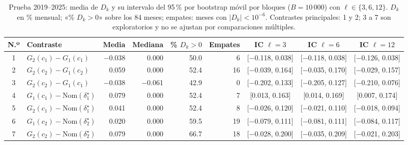 \begin{table}[h]
\centering
\footnotesize
\setlength{\tabcolsep}{4pt}
\caption{Prueba 2019--2025: media de $D_k$ y su intervalo del 95\,\% por bootstrap móvil por bloques ($B=10\,000$) con $\ell\in\{3,6,12\}$. $D_k$ en \% mensual; «\% $D_k>0$» sobre los 84 meses; empates: meses con $|D_k|<10^{-6}$. Contrastes principales: 1 y 2; 3 a 7 son exploratorios y no se ajustan por comparaciones múltiples.}\label{tab:r4_bootstrap}
\begin{tabular}{|c|l|r|r|r|r|c|c|c|}
\hline
\textbf{N.º} & \textbf{Contraste} & \textbf{Media} & \textbf{Mediana} & \textbf{\% $D_k>0$} & \textbf{Empates} & \textbf{IC $\ell=3$} & \textbf{IC $\ell=6$} & \textbf{IC $\ell=12$} \\ \hline
1 & $G_2(c_1)-G_1(c_1)$ & $-$0.038 & 0.000 & 50.0 & 6 & [$-$0.118, 0.038] & [$-$0.118, 0.038] & [$-$0.126, 0.038] \\ \hline
2 & $G_2(c_2)-G_1(c_2)$ & 0.059 & 0.000 & 52.4 & 16 & [$-$0.039, 0.164] & [$-$0.035, 0.170] & [$-$0.029, 0.157] \\ \hline \hline
3 & $G_2(c_2)-G_1(c_1)$ & $-$0.038 & $-$0.061 & 42.9 & 0 & [$-$0.202, 0.133] & [$-$0.205, 0.127] & [$-$0.210, 0.076] \\ \hline
4 & $G_1(c_1)-\mathrm{Nom}(\delta_1^\star)$ & 0.079 & 0.000 & 52.4 & 7 & [0.013, 0.163] & [0.014, 0.169] & [0.007, 0.174] \\ \hline
5 & $G_2(c_1)-\mathrm{Nom}(\delta_1^\star)$ & 0.041 & 0.000 & 52.4 & 8 & [$-$0.026, 0.120] & [$-$0.021, 0.110] & [$-$0.018, 0.094] \\ \hline
6 & $G_1(c_2)-\mathrm{Nom}(\delta_2^\star)$ & 0.020 & 0.000 & 59.5 & 19 & [$-$0.079, 0.111] & [$-$0.081, 0.111] & [$-$0.084, 0.117] \\ \hline
7 & $G_2(c_2)-\mathrm{Nom}(\delta_2^\star)$ & 0.079 & 0.000 & 66.7 & 18 & [$-$0.028, 0.200] & [$-$0.035, 0.209] & [$-$0.021, 0.203] \\ \hline
\end{tabular}
\end{table}
